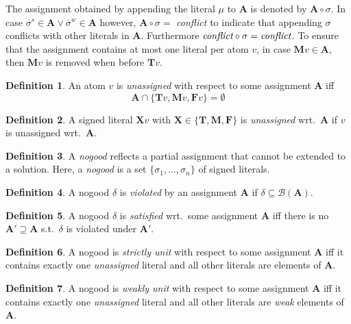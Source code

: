 \documentclass{vutinfth} %
\theoremstyle{example}
\theoremstyle{definition}
\newtheorem{definition}{Definition}[section]
\theoremstyle{theorem}
\theoremstyle{lemma}
\theoremstyle{corollary}
\newcommand{\negstrong}[1]{\overline{#1}^s}
\newcommand{\negweak}[1]{\overline{#1}^w}
\newcommand{\bass}{\mathcal{B}}
\newcommand{\ass}{\mathbf{A}}
\newcommand{\bT}{\mathbf{T}}
\newcommand{\bM}{\mathbf{M}}
\newcommand{\bF}{\mathbf{F}}
\newcommand{\bX}{\mathbf{X}}
\newcommand{\sgl}{\mu}
\newcommand{\bsgl}{\sigma}
\newcommand{\thrice}{{\{\bT, \bM, \bF \}}}
\begin{document}
The assignment obtained by appending the literal $\sgl$ to $\ass$ is denoted by $\ass \circ \sigma$. In case $\negstrong{\sigma} \in \ass \vee \negweak{\sigma} \in \ass$ however, $\ass \circ \sigma =$ \emph{conflict} to indicate that appending $\sigma$ conflicts with other literals in $\ass$. Furthermore $\emph{conflict} \circ \sigma = \emph{conflict}$. To ensure that the assignment contains at most one literal per atom $v$, in case $\mathbf{M}v \in \ass$, then $\mathbf{M}v$ is removed when before $\mathbf{T}v$.

\begin{definition}
An atom $v$ is \emph{unassigned} with respect to some assignment $\ass$ iff $$\ass \cap \{\bT v, \bM v, \bF v \} = \emptyset$$
\end{definition}

\begin{definition}
A signed literal $\bX v$ with $\bX \in \thrice$ is \emph{unassigned} wrt.~$\ass$ if $v$ is unassigned wrt.~$\ass$.
\end{definition}

\begin{definition}
A \emph{nogood} reflects a partial assignment that cannot be extended to a solution. Here, a \emph{nogood} is a set $\{ \bsgl_1, \ldots, \bsgl_n \}$ of signed literals.
\end{definition}

\begin{definition}
A nogood $\delta$ is \emph{violated} by an assignment $\ass$ if $\delta \subseteq \bass(\ass)$.
\end{definition}

\begin{definition}
A nogood $\delta$ is \emph{satisfied} wrt.~some assignment $\ass$ iff there is no $\ass' \supseteq \ass$ s.t.~$\delta$ is violated under $\ass'$.
\end{definition}

\begin{definition}
A nogood is \emph{strictly unit} with respect to some assignment $\ass$ iff it contains exactly one \emph{unassigned} literal and all other literals are elements of $\ass$.
\end{definition}

\begin{definition}
A nogood is \emph{weakly unit} with respect to some assignment $\ass$ iff it contains exactly one \emph{unassigned} literal and all other literals are \emph{weak} elements of $\ass$.
\end{definition}
\end{document}
